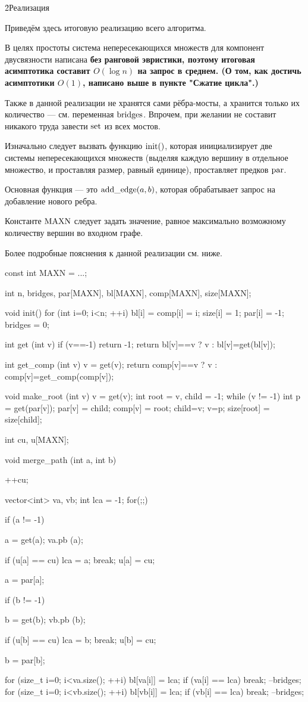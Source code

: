 \h2{Реализация}

Приведём здесь итоговую реализацию всего алгоритма.

В целях простоты система непересекающихся множеств для компонент двусвязности написана \bf{без ранговой эвристики}, поэтому итоговая асимптотика составит $O(\log n)$ на запрос в среднем. (О том, как достичь асимптотики $O(1)$, написано выше в пункте "Сжатие цикла".)

Также в данной реализации не хранятся сами рёбра-мосты, а хранится только их количество --- см. переменная $\rm bridges$. Впрочем, при желании не составит никакого труда завести ${\rm set}$ из всех мостов.

Изначально следует вызвать функцию ${\rm init}()$, которая инициализирует две системы непересекающихся множеств (выделяя каждую вершину в отдельное множество, и проставляя размер, равный единице), проставляет предков ${\rm par}$.

Основная функция --- это ${\rm add\_edge}(a,b)$, которая обрабатывает запрос на добавление нового ребра.

Константе $\rm MAXN$ следует задать значение, равное максимально возможному количеству вершин во входном графе.

Более подробные пояснения к данной реализации см. ниже.


\code
const int MAXN = ...;

int n, bridges, par[MAXN], bl[MAXN], comp[MAXN], size[MAXN];


void init() {
	for (int i=0; i<n; ++i) {
		bl[i] = comp[i] = i;
		size[i] = 1;
		par[i] = -1;
	}
	bridges = 0;
}


int get (int v) {
	if (v==-1)  return -1;
	return bl[v]==v ? v : bl[v]=get(bl[v]);
}

int get_comp (int v) {
	v = get(v);
	return comp[v]==v ? v : comp[v]=get_comp(comp[v]);
}

void make_root (int v) {
	v = get(v);
	int root = v,
		child = -1;
	while (v != -1) {
		int p = get(par[v]);
		par[v] = child;
		comp[v] = root;
		child=v;  v=p;
	}
	size[root] = size[child];
}


int cu, u[MAXN];

void merge_path (int a, int b) {
	++cu;

	vector<int> va, vb;
	int lca = -1;
	for(;;) {
		if (a != -1) {
			a = get(a);
			va.pb (a);

			if (u[a] == cu) {
				lca = a;
				break;
			}
			u[a] = cu;
	
			a = par[a];
		}

		if (b != -1) {
			b = get(b);
			vb.pb (b);

			if (u[b] == cu) {
				lca = b;
				break;
			}
			u[b] = cu;
	
			b = par[b];
		}
	}

	for (size_t i=0; i<va.size(); ++i) {
		bl[va[i]] = lca;
		if (va[i] == lca)  break;
		--bridges;
	}
	for (size_t i=0; i<vb.size(); ++i) {
		bl[vb[i]] = lca;
		if (vb[i] == lca)  break;
		--bridges;
	}
}


